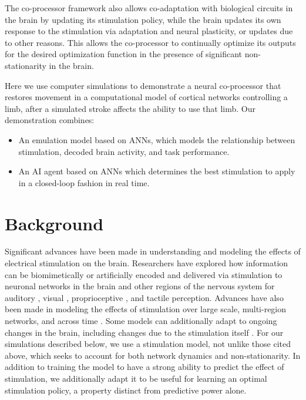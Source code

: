 \documentclass[12pt]{iopart}
\begin{document}
The co-processor framework also allows co-adaptation with biological circuits in the brain by updating its stimulation policy, while the brain updates its own response to the stimulation via adaptation and neural plasticity, or updates due to other reasons. This allows the co-processor to continually optimize its outputs for the desired optimization function in the presence of significant non-stationarity in the brain.

Here we use computer simulations to demonstrate a neural co-processor that restores
movement in a computational model of cortical networks controlling a limb, after a simulated stroke affects the ability to
use that limb. Our demonstration combines:
\begin{itemize}
	\item An emulation model based on ANNs, which models the relationship between 
	      stimulation, decoded brain activity, and task performance.
	\item An AI agent based on ANNs which determines the best stimulation to apply in a closed-loop fashion in real time.
\end{itemize}

\section{Background}
Significant advances have been made in understanding and modeling the effects of electrical stimulation
on the brain. Researchers have explored how information can be biomimetically or
artificially encoded and delivered via stimulation to neuronal networks in the brain and
other regions of the nervous system for auditory \cite{niparko.cochlear}, visual \cite{weiland.retinal},
proprioceptive \cite{tomlinson.propr}, and tactile
\cite{tabot.tact, tyler.tact, dadarlat.tact, sharlene.tact, cronin.tact} perception.
Advances have also been made in modeling the effects of stimulation over large scale, multi-region
networks, and across time \cite{shanechi.stimmodel}. Some models can additionally adapt to ongoing
changes in the brain, including changes due to the stimulation itself
\cite{tafazoli.acls}. For our simulations described below, we use a stimulation
model, not unlike those cited above, which seeks to account for both network dynamics
and non-stationarity. In addition to training the model to have a strong ability to predict
the effect of stimulation, we additionally adapt it to be useful for learning an
optimal stimulation policy, a property distinct from predictive
power alone.
\end{document}
